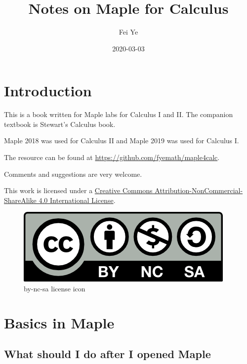 \documentclass[en,11pt,simple]{elegantbook}
\title{Notes on Maple for Calculus}
\author{Fei Ye}
\date{2020-03-03}
\renewcommand{\baselinestretch}{1.2}
\renewcommand{\baselinestretch}{0.975}
\begin{document}
\maketitle

{
\setcounter{tocdepth}{0}
\tableofcontents
}
\mainmatter

\hypersetup{pageanchor=true}

\renewcommand{\baselinestretch}{1.2}\normalsize

\captionsetup[figure]{labelformat=empty}
\captionsetup[subfigure]{labelformat=empty}

\hypertarget{introduction}{%
\chapter*{Introduction}\label{introduction}}

This is a book written for Maple labs for Calculus I and II. The companion textbook is Stewart's Calculus book.

Maple 2018 was used for Calculus II and Maple 2019 was used for Calculus I.

The resource can be found at \url{https://github.com/fyemath/maple4calc}.

Comments and suggestions are very welcome.

This work is licensed under a \href{https://creativecommons.org/licenses/by-nc-sa/4.0/}{Creative Commons Attribution-NonCommercial-ShareAlike 4.0 International License}.

\begin{figure}
\centering
\includegraphics{figs/by-nc-sa.png}
\caption{by-nc-sa license icon}
\end{figure}

\hypertarget{basics-in-maple}{%
\chapter{Basics in Maple}\label{basics-in-maple}}

\hypertarget{what-should-i-do-after-i-opened-maple}{%
\section{What should I do after I opened Maple}\label{what-should-i-do-after-i-opened-maple}}
\end{document}
